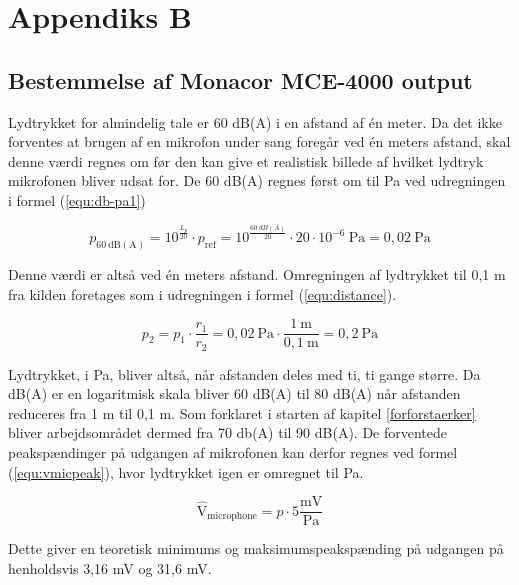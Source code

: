 \chapter{Appendiks B}
\section*{Bestemmelse af Monacor MCE-4000 output}
Lydtrykket for almindelig tale er 60 dB(A) i en afstand af én meter. Da det ikke forventes at brugen af en mikrofon under sang foregår ved én meters  afstand, skal denne værdi regnes om før den kan give et realistisk billede af hvilket lydtryk mikrofonen bliver udsat for. De 60 dB(A) regnes først om til Pa ved udregningen i formel (\ref{equ:db-pa1})

\begin{equation}
\label{equ:db-pa1}
p_{\mathrm{60~dB(A)}} = 10^{\frac{L_p}{20}} \cdot p_{\mathrm{ref}} = 10^{\frac{60~dB(A)}{20}} \cdot 20 \cdot 10^{-6}~\mathrm{Pa} = 0,02~\mathrm{Pa}
\end{equation}

Denne værdi er altså ved én meters afstand. Omregningen af lydtrykket til 0,1 m fra kilden foretages som i udregningen i formel (\ref{equ:distance}).

\begin{equation}
\label{equ:distance}
p_2 = p_1 \cdot \frac{r_1}{r_2} = 0,02~\mathrm{Pa} \cdot \frac{1~\mathrm{m}}{0,1~\mathrm{m}} = 0,2~\mathrm{Pa}
\end{equation}

Lydtrykket, i Pa, bliver altså, når afstanden deles med ti, ti gange større. Da dB(A) er en logaritmisk skala bliver 60 dB(A) til 80 dB(A) når afstanden reduceres fra 1 m til 0,1 m. Som forklaret i starten af kapitel \ref{forforstaerker} bliver arbejdsområdet dermed fra 70 db(A) til 90 dB(A). De forventede peakspændinger på udgangen af mikrofonen kan derfor regnes ved formel (\ref{equ:vmicpeak}), hvor lydtrykket igen er omregnet til Pa.

\begin{equation}
\label{equ:vmicpeak}
\hat{\mathrm{V}}_{\mathrm{microphone}} = p \cdot 5\frac{\mathrm{mV}}{\mathrm{Pa}}
\end{equation}

Dette giver en teoretisk minimums og maksimumspeakspænding på udgangen på henholdsvis 3,16 mV og 31,6 mV.
